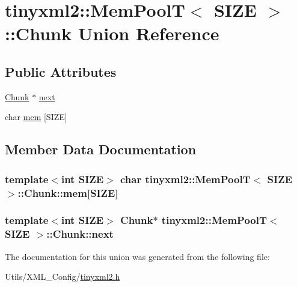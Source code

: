 \hypertarget{uniontinyxml2_1_1_mem_pool_t_1_1_chunk}{\section{tinyxml2\-:\-:Mem\-Pool\-T$<$ S\-I\-Z\-E $>$\-:\-:Chunk Union Reference}
\label{uniontinyxml2_1_1_mem_pool_t_1_1_chunk}
}
\subsection*{Public Attributes}
\begin{DoxyCompactItemize}
\item 
\hyperlink{uniontinyxml2_1_1_mem_pool_t_1_1_chunk}{Chunk} $\ast$ \hyperlink{uniontinyxml2_1_1_mem_pool_t_1_1_chunk_ae97e0810e7bf7a28264f3e1f112d52b4}{next}
\item 
char \hyperlink{uniontinyxml2_1_1_mem_pool_t_1_1_chunk_a977aaaca9a6b080faada2ac779388ee6}{mem} \mbox{[}S\-I\-Z\-E\mbox{]}
\end{DoxyCompactItemize}


\subsection{Member Data Documentation}
\hypertarget{uniontinyxml2_1_1_mem_pool_t_1_1_chunk_a977aaaca9a6b080faada2ac779388ee6}{
\subsubsection[{mem}]{\setlength{\rightskip}{0pt plus 5cm}template$<$int S\-I\-Z\-E$>$ char {\bf tinyxml2\-::\-Mem\-Pool\-T}$<$ S\-I\-Z\-E $>$\-::Chunk\-::mem\mbox{[}S\-I\-Z\-E\mbox{]}}}\label{uniontinyxml2_1_1_mem_pool_t_1_1_chunk_a977aaaca9a6b080faada2ac779388ee6}
\hypertarget{uniontinyxml2_1_1_mem_pool_t_1_1_chunk_ae97e0810e7bf7a28264f3e1f112d52b4}{
\subsubsection[{next}]{\setlength{\rightskip}{0pt plus 5cm}template$<$int S\-I\-Z\-E$>$ {\bf Chunk}$\ast$ {\bf tinyxml2\-::\-Mem\-Pool\-T}$<$ S\-I\-Z\-E $>$\-::Chunk\-::next}}\label{uniontinyxml2_1_1_mem_pool_t_1_1_chunk_ae97e0810e7bf7a28264f3e1f112d52b4}


The documentation for this union was generated from the following file\-:\begin{DoxyCompactItemize}
\item 
Utils/\-X\-M\-L\-\_\-\-Config/\hyperlink{tinyxml2_8h}{tinyxml2.\-h}\end{DoxyCompactItemize}
